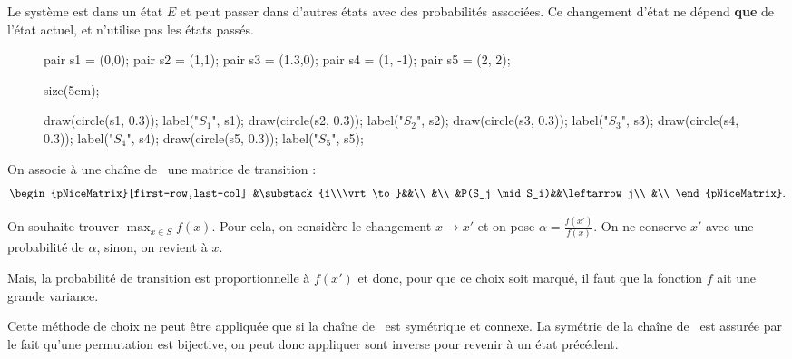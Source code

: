 \begin{defn}
	Le système est dans un état $E$ et peut passer dans d'autres états avec des probabilités associées. Ce changement d'état ne dépend {\bf que} de l'état actuel, et n'utilise pas les états passés.

	\begin{figure}[H]
		\centering
		\begin{asy}
			pair s1 = (0,0);
			pair s2 = (1,1);
			pair s3 = (1.3,0);
			pair s4 = (1, -1);
			pair s5 = (2, 2);

			size(5cm);

			draw(circle(s1, 0.3)); label("$S_1$", s1);
			draw(circle(s2, 0.3)); label("$S_2$", s2);
			draw(circle(s3, 0.3)); label("$S_3$", s3);
			draw(circle(s4, 0.3)); label("$S_4$", s4);
			draw(circle(s5, 0.3)); label("$S_5$", s5);
		\end{asy}
	\end{figure}

	On associe à une chaîne de \Markov~une matrice de transition : \[
		\begin{pNiceMatrix}[first-row,last-col]
			&\substack{i\\\vrt\to}&&\\
			&\\
			&P(S_j \mid S_i)&&\leftarrow j\\
			&\\
		\end{pNiceMatrix}
	.\]
\end{defn}

On souhaite trouver $\max_{x \in S} f(x)$. Pour cela, on considère le changement $x \longrightarrow x'$ et on pose $\textstyle \alpha = \frac{f(x')}{f(x)}$. On ne conserve $x'$ avec une probabilité de $\alpha$, sinon, on revient à $x$.

Mais, la probabilité de transition est proportionnelle à $f(x')$ et donc, pour que ce choix soit marqué, il faut que la fonction $f$ ait une grande variance.

Cette méthode de choix ne peut être appliquée que si la chaîne de \Markov~est symétrique et connexe. La symétrie de la chaîne de \Markov~est assurée par le fait qu'une permutation est bijective, on peut donc appliquer sont inverse pour revenir à un état précédent.


